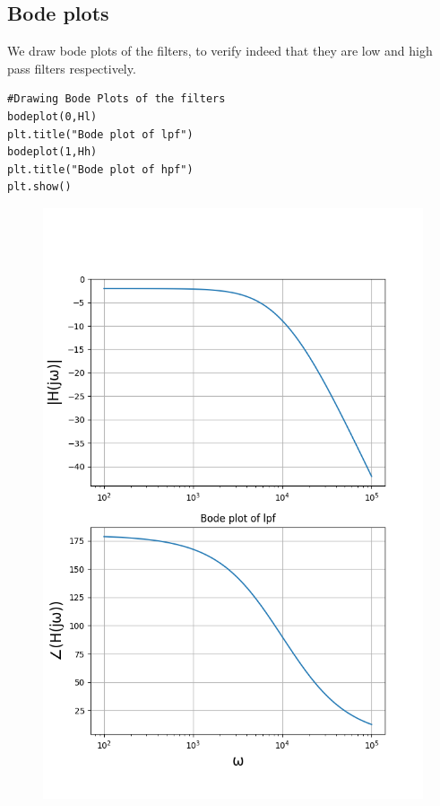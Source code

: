 \documentclass[11pt, a4paper]{article}
\begin{document}
\subsection{Bode plots}
{
We draw bode plots of the filters, to verify indeed that they are low and high pass filters respectively.
}
\begin{verbatim}
#Drawing Bode Plots of the filters
bodeplot(0,Hl)
plt.title("Bode plot of lpf")
bodeplot(1,Hh)
plt.title("Bode plot of hpf")
plt.show()

\end{verbatim}
\begin{figure}[!tbh]
   	\centering
   	\includegraphics[scale=0.5]{img1.png}
   	\label{fig:32}
   \end{figure}
\end{document}
